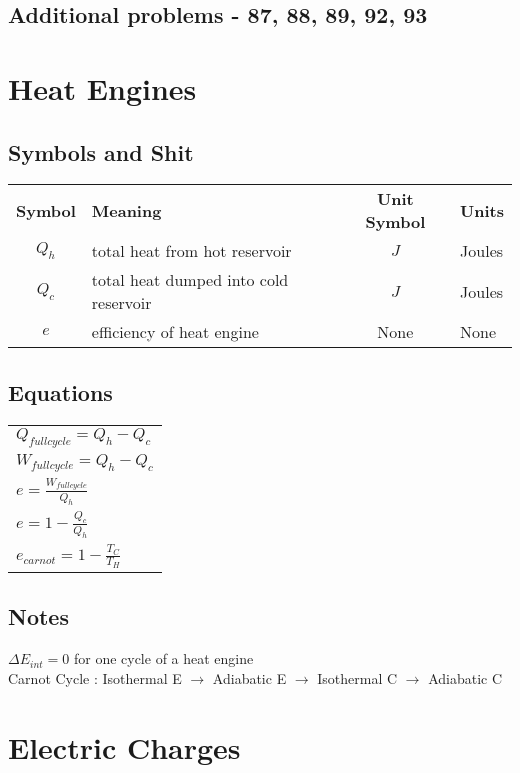 \documentclass[12pt, letterpaper, twoside]{article}
\begin{document}
  \subsection*{Additional problems - 87, 88, 89, 92, 93}
  
  
  
\section{Heat Engines}
  \subsection*{Symbols and Shit}
    \begin{tabular}{c l c l}
  	  \textbf{Symbol} & \textbf{Meaning} & \textbf{Unit Symbol} & \textbf{Units}\\
  	  $Q_h$ & total heat from hot reservoir & $J$ & Joules\\
  	  $Q_c$ & total heat dumped into cold reservoir & $J$ & Joules\\
  	  $e$ & efficiency of heat engine & None & None\\
  	  
    \end{tabular}
  
  \subsection*{Equations}
    \begin{tabular}{l}
      $Q_{full cycle} = Q_h - Q_c$\\
      $W_{full cycle} = Q_h - Q_c$\\
      $e = \frac{W_{full cycle}}{Q_h}$\\
      $e = 1 - \frac{Q_c}{Q_h}$\\
      $e_{carnot} = 1 - \frac{T_C}{T_H}$\\
      
    \end{tabular}
  
  \subsection*{Notes}
    $\Delta E_{int} = 0$ for one cycle of a heat engine\\
    Carnot Cycle : Isothermal E $\rightarrow$ Adiabatic E $\rightarrow$ Isothermal C $\rightarrow$ Adiabatic C\\
    
    
\section{Electric Charges}
\end{document}

